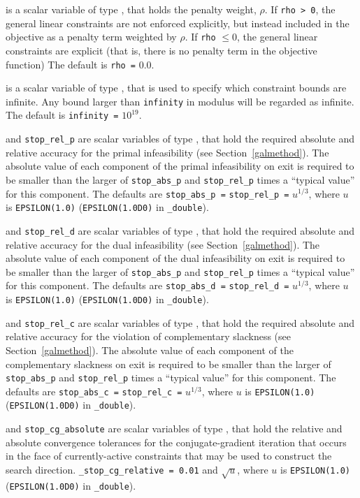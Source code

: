 \begin{description}
 is a scalar variable of type \realdp, that holds
the penalty weight, $\rho$. If {\tt rho > 0}, the general linear constraints are
not enforced explicitly, but instead included in the objective as a penalty term
weighted by $\rho$. If {\tt rho} $\leq 0$, the general linear constraints are
explicit (that is, there is no penalty term in the objective function)
The default is {\tt rho =} $0.0$.

 is a scalar variable of type \realdp, that is used to
specify which constraint bounds are infinite.
Any bound larger than {\tt infinity} in modulus will be regarded as infinite.
The default is {\tt infinity =} $10^{19}$.

 and {\tt stop\_rel\_p}
are scalar variables of type \realdp, that hold the
required absolute and relative accuracy for the primal infeasibility
(see Section~\ref{galmethod}).
The absolute value of each component of the primal infeasibility
on exit is required to be smaller than the larger of {\tt stop\_abs\_p} and
{\tt stop\_rel\_p} times a ``typical value'' for this component.
The defaults are {\tt stop\_abs\_p =} {\tt stop\_rel\_p =} $u^{1/3}$,
where $u$ is {\tt EPSILON(1.0)} ({\tt EPSILON(1.0D0)} in
{\tt \fullpackagename\_double}).

 and {\tt stop\_rel\_d}
are scalar variables of type \realdp, that hold the
required absolute and relative accuracy for the dual infeasibility
(see Section~\ref{galmethod}).
The absolute value of each component of the dual infeasibility
on exit is required to be smaller than the larger of {\tt stop\_abs\_p} and
{\tt stop\_rel\_p} times a ``typical value'' for this component.
The defaults are {\tt stop\_abs\_d =} {\tt stop\_rel\_d =} $u^{1/3}$,
where $u$ is {\tt EPSILON(1.0)} ({\tt EPSILON(1.0D0)} in
{\tt \fullpackagename\_double}).

 and {\tt stop\_rel\_c}
are scalar variables of type \realdp, that hold the
required absolute and relative accuracy
for the violation of complementary slackness
(see Section~\ref{galmethod}).
The absolute value of each component of the complementary slackness
on exit is required to be smaller than the larger of {\tt stop\_abs\_p} and
{\tt stop\_rel\_p} times a ``typical value'' for this component.
The defaults are {\tt stop\_abs\_c =} {\tt stop\_rel\_c =} $u^{1/3}$,
where $u$ is {\tt EPSILON(1.0)} ({\tt EPSILON(1.0D0)} in
{\tt \fullpackagename\_double}).

 and {\tt stop\_cg\_absolute}
are scalar variables of type \realdp,
that hold the relative and absolute convergence tolerances for the
conjugate-gradient iteration that occurs in the face of currently-active
constraints that may be used to construct the search direction.
{\tt \_stop\_cg\_relative = 0.01}
and  $\sqrt{u}$,
where $u$ is {\tt EPSILON(1.0)} ({\tt EPSILON(1.0D0)} in
{\tt \fullpackagename\_double}).


\end{description}
